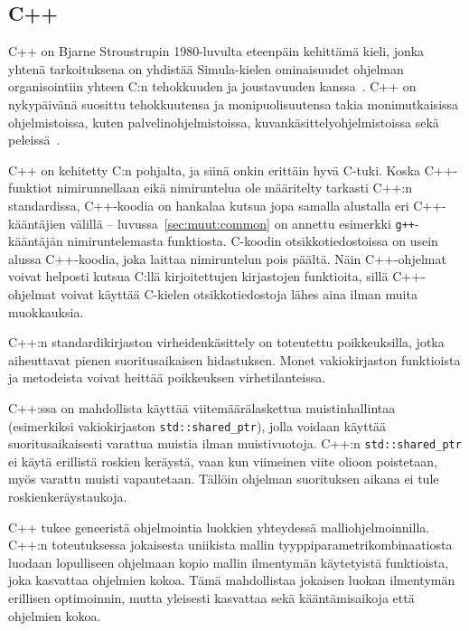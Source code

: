 \subsection{C++}

C++ on Bjarne Stroustrupin 1980-luvulta eteenpäin kehittämä kieli, jonka
yhtenä tarkoituksena on yhdistää Simula-kielen ominaisuudet ohjelman
organisointiin yhteen C:n tehokkuuden ja joustavuuden
kanssa~\citep{cpphistory}. C++ on nykypäivänä suosittu tehokkuutensa ja
monipuolisuutensa takia monimutkaisissa ohjelmistoissa, kuten
palvelinohjelmistoissa, kuvankäsittelyohjelmistoissa sekä
peleissä~\citep{cppapps}.

C++ on kehitetty C:n pohjalta, ja siinä onkin erittäin hyvä C-tuki. Koska
C++\hyp{}funktiot nimirunnellaan eikä nimiruntelua ole määritelty tarkasti C++:n
standardissa, C++-koodia on hankalaa kutsua jopa samalla alustalla eri
C++-kääntäjien välillä -- luvussa~\ref{sec:muut:common} on annettu esimerkki
\texttt{g++}-kääntäjän nimiruntelemasta funktiosta. C-koodin
otsikkotiedostoissa on usein alussa C++-koodia, joka
laittaa nimiruntelun pois päältä. Näin C++-ohjelmat voivat helposti kutsua
C:llä kirjoitettujen kirjastojen funktioita, sillä C++-ohjelmat voivat käyttää
C-kielen otsikkotiedostoja lähes aina ilman muita muokkauksia.

C++:n standardikirjaston virheidenkäsittely on toteutettu poikkeuksilla, jotka
aiheuttavat pienen suoritusaikaisen hidastuksen. Monet vakiokirjaston funktioista ja
metodeista voivat heittää poikkeuksen virhetilanteissa.

C++:ssa on mahdollista käyttää viitemäärälaskettua
muistinhallintaa (esimerkiksi vakiokirjaston \texttt{std::shared\_ptr}), jolla
voidaan käyttää suoritusaikaisesti varattua muistia ilman muistivuotoja. C++:n
\texttt{std::shared\_ptr} ei käytä erillistä roskien keräystä, vaan kun
viimeinen viite olioon poistetaan, myös varattu muisti vapautetaan. Tällöin
ohjelman suorituksen aikana ei tule roskienkeräystaukoja.

C++ tukee geneeristä ohjelmointia luokkien
yhteydessä malliohjelmoinnilla. C++:n
toteutuksessa jokaisesta uniikista mallin tyyppiparametrikombinaatiosta luodaan
lopulliseen ohjelmaan kopio mallin ilmentymän käytetyistä
funktioista, joka kasvattaa ohjelmien kokoa. Tämä mahdollistaa jokaisen luokan
ilmentymän erillisen optimoinnin, mutta yleisesti kasvattaa sekä
kääntämisaikoja että ohjelmien kokoa.

